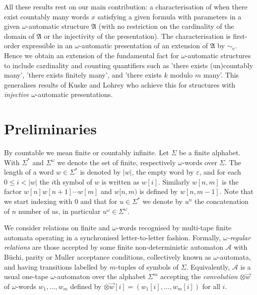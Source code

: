 \documentclass{stacs_proc}
\newcommand{\eqe}{\sim_{\textrm{e}}}
\newcommand{\calA}{\mathcal{A}}
\newcommand{\frakA}{\mathfrak{A}}
\begin{document}
All these results rest on our main contribution: a characterisation of when
there exist countably many words $x$ satisfying a given formula with parameters
in a given $\omega$-automatic structure $\frakA$ (with no restriction on the cardinality
of the domain of $\frakA$ or the injectivity of the presentation). The
characterisation is first-order expressible in an $\omega$-automatic
presentation of an extension of $\frakA$ by $\eqe$.
Hence we obtain an extension of the fundamental fact for $\omega$-automatic
structures to include cardinality and counting quantifiers such as 'there exists
(un)countably many', 'there exists finitely many', and 'there exists $k$ modulo
$m$ many'.  This generalises results of Kuske and Lohrey \cite{KL06} who achieve
this for structures with \emph{injective} $\omega$-automatic presentations.
 


\vskip-0.3cm
\section{Preliminaries} \label{sec_prelim}



By countable we mean finite or countably infinite. 
Let $\Sigma$ be a finite alphabet. With $\Sigma^\ast$ and $\Sigma^\omega$
we denote the set of finite, respectively $\omega$-words over $\Sigma$.
The length of a word $w \in \Sigma^\ast$ is denoted by $|w|$,
the empty word by $\varepsilon$, 
and for each $0 \leq i < |w|$ the $i$th symbol of $w$ is written as $w[i]$. 
Similarly $w[n,m]$ is the factor $w[n]w[n+1]\cdots w[m]$ and $w[n,m)$ is defined
by $w[n,m-1]$.
Note that we start indexing with $0$ and that for $u \in \Sigma^\ast$ we
denote by $u^n$ the concatenation of $n$ number of $u$s, in particular
$u^\omega \in \Sigma^\omega$. 

We consider relations on finite and $\omega$-words recognised by multi-tape
finite automata operating in a synchronised letter-to-letter fashion.
Formally, \emph{$\omega$-regular relations} are those accepted by some
finite non-deterministic automaton $\calA$ with B\"uchi, parity or Muller
acceptance conditions, collectively known as $\omega$-automata,
and having transitions labelled by $m$-tuples of symbols of $\Sigma$.
Equivalently, $\calA$ is a usual one-tape $\omega$-automaton over the
alphabet $\Sigma^m$ accepting the \emph{convolution} $\otimes\vec{w}$ of
$\omega$-words $w_1,\ldots,w_m$ defined by 
$\otimes\vec{w}[i] = (w_1[i], \ldots, w_m[i])$ for all $i$.
\end{document}
